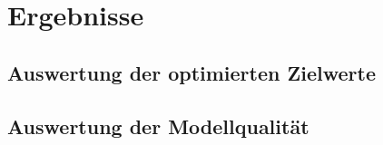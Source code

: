 \chapter{Ergebnisse}
\section{Auswertung der optimierten Zielwerte}
\section{Auswertung der Modellqualität}